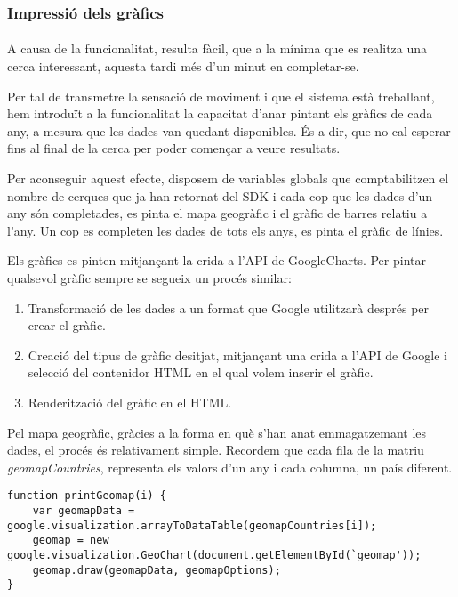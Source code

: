 \subsubsection{Impressió dels gràfics}

\paragraph{}
A causa de la funcionalitat, resulta fàcil, que a la mínima que es realitza una cerca interessant, aquesta tardi més d'un minut en completar-se.

Per tal de transmetre la sensació de moviment i que el sistema està treballant, hem introduït a la funcionalitat la capacitat d'anar pintant els gràfics de cada any, a mesura que les dades van quedant disponibles. És a dir, que no cal esperar fins al final de la cerca per poder començar a veure resultats.

Per aconseguir aquest efecte, disposem de variables globals que comptabilitzen el nombre de cerques que ja han retornat del SDK i cada cop que les dades d'un any són completades, es pinta el mapa geogràfic i el gràfic de barres relatiu a l'any. Un cop es completen les dades de tots els anys, es pinta el gràfic de línies.

Els gràfics es pinten mitjançant la crida a l'API de GoogleCharts. Per pintar qualsevol gràfic sempre se segueix un procés similar:

\begin{enumerate}
    \item Transformació de les dades a un format que Google utilitzarà després per crear el gràfic.
    \item Creació del tipus de gràfic desitjat, mitjançant una crida a l'API de Google i selecció del contenidor HTML en el qual volem inserir el gràfic.
    \item Renderització del gràfic en el HTML.
\end{enumerate}

Pel mapa geogràfic, gràcies a la forma en què s’han anat emmagatzemant les dades, el procés és relativament simple. Recordem que cada fila de la matriu \emph{geomapCountries}, representa els valors d’un any i cada columna, un país diferent.

\begin{lstlisting}[style=rawOwn,caption={Creació del mapa geogràfic}]
function printGeomap(i) {
    var geomapData = google.visualization.arrayToDataTable(geomapCountries[i]);
    geomap = new google.visualization.GeoChart(document.getElementById(`geomap'));
    geomap.draw(geomapData, geomapOptions);
}
\end{lstlisting}

